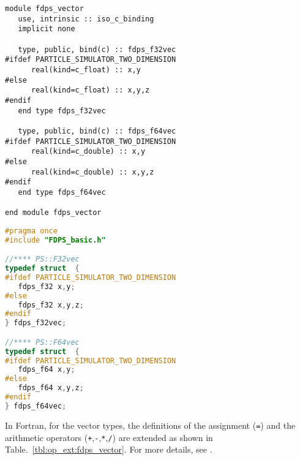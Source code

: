\begin{lstlisting}[caption=Vector types (Fortran),label=listing:vector_types]
module fdps_vector
   use, intrinsic :: iso_c_binding
   implicit none
   
   type, public, bind(c) :: fdps_f32vec
#ifdef PARTICLE_SIMULATOR_TWO_DIMENSION 
      real(kind=c_float) :: x,y
#else
      real(kind=c_float) :: x,y,z
#endif
   end type fdps_f32vec

   type, public, bind(c) :: fdps_f64vec
#ifdef PARTICLE_SIMULATOR_TWO_DIMENSION 
      real(kind=c_double) :: x,y
#else
      real(kind=c_double) :: x,y,z
#endif
   end type fdps_f64vec

end module fdps_vector
\end{lstlisting}

\begin{lstlisting}[language=C,caption=Vector types (C), label=listing:vector_types_in_C]
#pragma once
#include "FDPS_basic.h"

//**** PS::F32vec
typedef struct  {
#ifdef PARTICLE_SIMULATOR_TWO_DIMENSION
   fdps_f32 x,y;
#else
   fdps_f32 x,y,z;
#endif
} fdps_f32vec;

//**** PS::F64vec
typedef struct  {
#ifdef PARTICLE_SIMULATOR_TWO_DIMENSION
   fdps_f64 x,y;
#else
   fdps_f64 x,y,z;
#endif
} fdps_f64vec;
\end{lstlisting}

In Fortran, for the vector types, the definitions of the assignment (\texttt{=}) and the arithmetic operators (\texttt{+},\texttt{-},\texttt{*},\texttt{/}) are extended as shown in Table.~\ref{tbl:op_ext:fdps_vector}. For more details, see .

